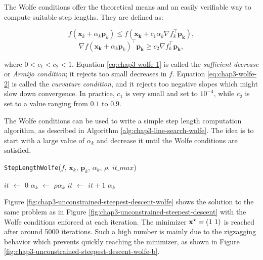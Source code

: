 The Wolfe conditions offer the theoretical means and an easily
verifiable way to compute suitable step lengths. They are defined as:

\begin{equation}
\label{eq:chap3-wolfe-1}
f(\mathbf{x}_k + \alpha_k\mathbf{p}_k) \le
f(\mathbf{x_k}+c_1\alpha_k\nabla f_k^{\top}\mathbf{p_k}),
\end{equation}
\begin{equation}
\label{eq:chap3-wolfe-2}
\nabla f(\mathbf{x_k} + \alpha_k
\mathbf{p}_k)^{\top}\mathbf{p_k} \ge c_2 \nabla f_k^{\top}\mathbf{p_k},
\end{equation}

where $0 < c_1 < c_2 < 1$. Equation \ref{eq:chap3-wolfe-1} is called
the \emph{sufficient decrease} or \emph {Armijo condition}; it rejects
too small decreases in $f$. Equation \ref{eq:chap3-wolfe-2} is called
the \emph{curvature condition}, and it rejects too negative slopes
which might slow down convergence. In practice, $c_1$ is very small
and set to $10^{-4}$, while $c_2$ is set to a value ranging from $0.1$
to $0.9$.

The Wolfe conditions can be used to write a simple step length
computation algorithm, as described in Algorithm
\ref{alg:chap3-line-search-wolfe}. The idea is to start with a large
value of $\alpha_k$ and decrease it until the Wolfe conditions are
satisfied.

\begin{algorithm}
\caption{\texttt{StepLengthWolfe}($f$, $\mathbf{x}_k$, $\mathbf{p}_k$,
  $\alpha_k$, $\rho$, $it\_max$)}
\label{alg:chap3-line-search-wolfe}
\begin{algorithmic}
\STATE $it$ $\leftarrow$ $0$
\STATE $\alpha_k$ $\leftarrow$ $\rho \alpha_k$ 
\STATE $it$ $\leftarrow$ $it + 1$
\ENDWHILE
\RETURN $\alpha_k$
\end{algorithmic}
\end{algorithm}

Figure \ref{fig:chap3-unconstrained-steepest-descent-wolfe} shows the
solution to the same problem as in Figure
\ref{fig:chap3-unconstrained-steepest-descent} with the Wolfe
conditions enforced at each iteration. The minimizer
$\mathbf{x}^{\star}=(1~1)$ is reached after around 5000 iterations. Such a
high number is mainly due to the zigzagging behavior which prevents
quickly reaching the minimizer, as shown in Figure
\ref{fig:chap3-unconstrained-steepest-descent-wolfe-b}.

